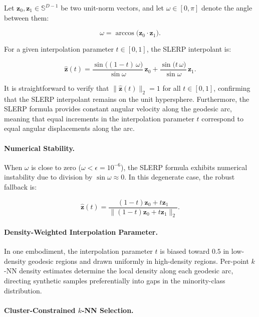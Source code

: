 \documentclass[12pt,letterpaper]{article}
\newcommand{\bz}{\mathbf{z}}
\newcommand{\Sphere}{\mathbb{S}}
\begin{document}
Let $\bz_0, \bz_1 \in \Sphere^{D-1}$ be two unit-norm vectors, and let
$\omega \in [0, \pi]$ denote the angle between them:

\begin{equation}
  \omega = \arccos\!\bigl(\bz_0 \cdot \bz_1\bigr).
  \label{eq:omega}
\end{equation}

For a given interpolation parameter $t \in [0,1]$, the SLERP interpolant is:

\begin{equation}
  \hat{\bz}(t) = \frac{\sin\bigl((1-t)\,\omega\bigr)}{\sin\omega}\,\bz_0
                + \frac{\sin\bigl(t\,\omega\bigr)}{\sin\omega}\,\bz_1.
  \label{eq:slerp}
\end{equation}

It is straightforward to verify that $\|\hat{\bz}(t)\|_2 = 1$ for all
$t \in [0,1]$, confirming that the SLERP interpolant remains on the unit
hypersphere.  Furthermore, the SLERP formula provides constant angular
velocity along the geodesic arc, meaning that equal increments in the
interpolation parameter $t$ correspond to equal angular displacements along
the arc.

\paragraph{Numerical Stability.}

When $\omega$ is close to zero ($\omega < \epsilon = 10^{-6}$), the SLERP
formula exhibits numerical instability due to division by $\sin\omega
\approx 0$.  In this degenerate case, the robust fallback is:

\begin{equation}
  \hat{\bz}(t) = \frac{(1-t)\bz_0 + t\bz_1}{\|(1-t)\bz_0 + t\bz_1\|_2}.
  \label{eq:slerp_fallback}
\end{equation}

\paragraph{Density-Weighted Interpolation Parameter.}

In one embodiment, the interpolation parameter $t$ is biased toward $0.5$ in
low-density geodesic regions and drawn uniformly in high-density regions.
Per-point $k$-NN density estimates determine the local density along each
geodesic arc, directing synthetic samples preferentially into gaps in the
minority-class distribution.

\paragraph{Cluster-Constrained $k$-NN Selection.}
\end{document}

